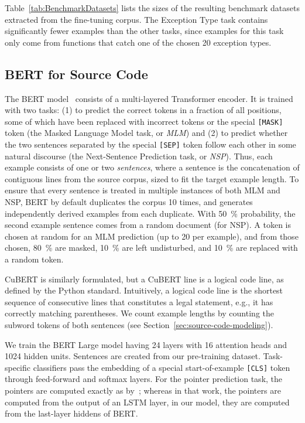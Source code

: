 \documentclass{article}
\newcommand{\BERTforCode}{CuBERT\xspace}
\newcommand{\update}[1]{#1}
\begin{document}
Table~\ref{tab:BenchmarkDatasets} lists the sizes of the resulting benchmark datasets extracted from the fine-tuning corpus. The Exception Type task contains significantly fewer examples than the other tasks, since examples for this task only come from functions that catch one of the chosen 20 exception types.

\subsection{BERT for Source Code}
\label{sec:bert-for-code}

The BERT model~\citep{devlin-etal-2019-bert} consists of a multi-layered Transformer encoder. It is trained with two tasks: (1) to predict the correct tokens in a fraction of all positions, some of which have been replaced with incorrect tokens or the special \texttt{[MASK]} token (the Masked Language Model task, or \emph{MLM}) and (2) to predict whether the two sentences separated by the special \texttt{[SEP]} token follow each other in some natural discourse (the Next-Sentence Prediction task, or \emph{NSP}). Thus, each example consists of one or two \emph{sentences}, where a sentence is the concatenation of contiguous lines from the source corpus, sized to fit the target example length. To ensure that every sentence is treated in multiple instances of both MLM and NSP, BERT by default duplicates the corpus \num{10} times, and generates independently derived examples from each duplicate. With \SI{50}{\percent} probability, the second example sentence comes from a random document (for NSP). \update{A token is chosen at random for an MLM prediction} (up to \num{20} per example), and from those chosen, \SI{80}{\percent} are masked, \SI{10}{\percent} are left undisturbed, and \SI{10}{\percent} are replaced with a random token.

\BERTforCode is similarly formulated, but a \BERTforCode \update{line} is a logical code line, as defined by the Python standard. Intuitively, a logical code line is the shortest sequence of consecutive lines that constitutes a legal statement, e.g., it has correctly matching parentheses. We count example lengths by counting the subword tokens of both sentences (see Section~\ref{sec:source-code-modeling}). 

We train the BERT Large model having 24 layers with 16 attention heads and 1024 hidden units. Sentences are created from our pre-training dataset. Task-specific classifiers pass the embedding of a special start-of-example \texttt{[CLS]} token through feed-forward and softmax layers. For the pointer prediction task, the pointers are computed exactly as by~\citet{DBLP:journals/corr/abs-1904-01720}; whereas in that work, the pointers are computed from the output of an LSTM layer, in our model, they are computed from the last-layer hiddens of  BERT.
\end{document}
